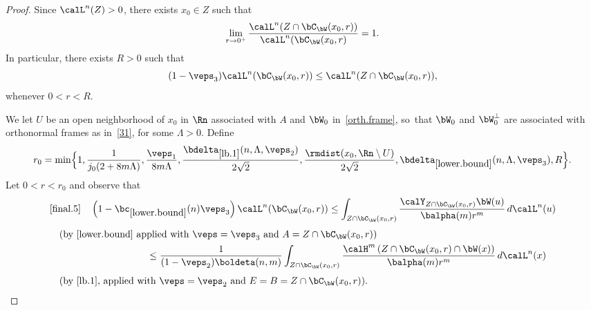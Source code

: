 \begin{proof}
Since $\calL^n(Z) > 0$, there exists $x_0 \in Z$ such that
\begin{equation*}
\lim_{r \to 0^+} \frac{\calL^n (Z \cap \bC_\bW(x_0,r))}{\calL^n (\bC_\bW(x_0,r)} = 1.
\end{equation*}
In particular, there exists $R > 0$ such that
\begin{equation}
\label{final.4}
(1- \veps_3) \calL^n (\bC_\bW(x_0,r)) \leq \calL^n(Z \cap \bC_\bW(x_0,r)),
\end{equation}
whenever $0 < r < R$.
\par
We let $U$ be an open neighborhood of $x_0$ in $\Rn$ associated with $A$ and $\bW_0$ in~\ref{orth.frame}, so~that $\bW_0$ and $\bW_0^\perp$ are associated with orthonormal frames as in~\ref{31}, for some $\Lambda > 0$.
Define
\begin{equation*}
r_0 = \min \Bigl\{ 1, \frac{1}{j_0(2+8m\Lambda)}, \frac{\veps_1}{8m\Lambda}, \frac{\bdelta_{\ref{lb.1}}(n,\Lambda,\veps_2)}{2\sqrt{2}}, \frac{\rmdist(x_0,\Rn \setminus U)}{2\sqrt{2}}, \bdelta_{\ref{lower.bound}}(n,\Lambda,\veps_3), R \Bigr\}.
\end{equation*}
Let $0 < r < r_0$ and observe that\vspace*{-10pt}
\label{final.5}
\begin{multline*}
\eqref{final.5}\quad\left(1 - \bc_{\ref{lower.bound}}(n) \veps_3\right)  \calL^n (\bC_\bW(x_0,r)) \leq \int_{Z \cap \bC_\bW(x_0,r)} \frac{\calY_{Z \cap \bC_\bW(x_0,r)} \bW(u)}{\balpha(m)r^m} \,d\calL^n(u)\\[3pt]
\shoveleft{\text{(by \ref{lower.bound} applied with $\veps=\veps_3$ and $A=Z \cap \bC_\bW(x_0,r)$)}}\\
\shoveright{\leq \frac{1}{(1-\veps_2) \boldeta(n,m)} \int_{Z \cap \bC_\bW(x_0,r)} \frac{\calH^m \left(Z \cap \bC_\bW(x_0,r) \cap \bW(x) \right)}{\balpha(m)r^m} \,d\calL^n(x)}\\[3pt]
\shoveleft{\text{(by \ref{lb.1}, applied with $\veps=\veps_2$ and $E=B=Z\cap\bC_\bW(x_0,r)$).}}\hfill\mbox{}
\end{multline*}


\end{proof}

